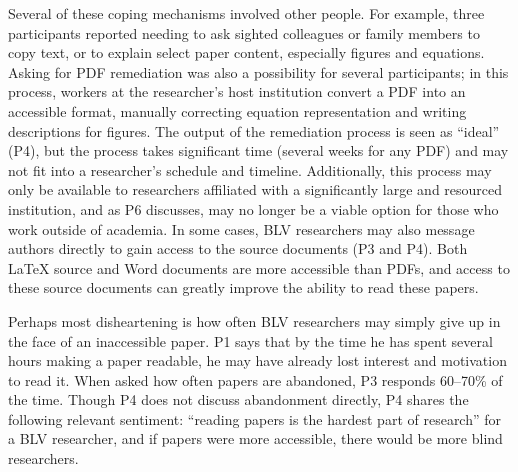 Several of these coping mechanisms involved other people. For example, three participants reported needing to ask sighted colleagues or family members to copy text, or to explain select paper content, especially figures and equations. Asking for PDF remediation was also a possibility for several participants; in this process, workers at the researcher's host institution convert a PDF into an accessible format, manually correcting equation representation and writing descriptions for figures. The output of the remediation process is seen as ``ideal'' (P4), but the process takes significant time (several weeks for any PDF) and may not fit into a researcher's schedule and timeline. Additionally, this process may only be available to researchers affiliated with a significantly large and resourced institution, and as P6 discusses, may no longer be a viable option for those who work outside of academia. In some cases, BLV researchers may also message authors directly to gain access to the source documents (P3 and P4). Both LaTeX source and Word documents are more accessible than PDFs, and access to these source documents can greatly improve the ability to read these papers.

Perhaps most disheartening is how often BLV researchers may simply give up in the face of an inaccessible paper. P1 says that by the time he has spent several hours making a paper readable, he may have already lost interest and motivation to read it. When asked how often papers are abandoned, P3 responds 60--70\% of the time. Though P4 does not discuss abandonment directly, P4 shares the following relevant sentiment: ``reading papers is the hardest part of research'' for a BLV researcher, and if papers were more accessible, there would be more blind researchers.

